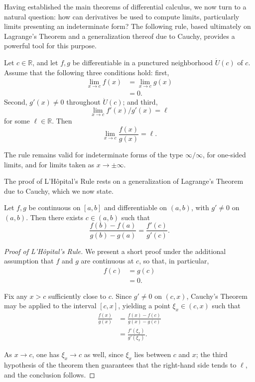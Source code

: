 Having established the main theorems of differential calculus, we now turn to a natural question: how can derivatives be used to compute limits, particularly limits presenting an indeterminate form? The following rule, based ultimately on Lagrange's Theorem and a generalization thereof due to Cauchy, provides a powerful tool for this purpose.

\begin{theorem}
Let $c \in \mathbb{R}$, and let $f, g$ be differentiable in a punctured neighborhood $\dot{U}(c)$ of $c$. Assume that the following three conditions hold: first,
\[
\begin{aligned}
\lim_{x \to c} f(x) &= \lim_{x \to c} g(x) \\
&= 0.
\end{aligned}
\]
Second, $g'(x) \neq 0$ throughout $\dot{U}(c)$; and third, \[
\lim_{x \to c} f'(x)/g'(x) = \ell
\] for some $\ell \in \mathbb{R}$. Then
\[
\lim_{x \to c} \frac{f(x)}{g(x)} = \ell.
\]

\end{theorem}

\begin{remark}
The rule remains valid for indeterminate forms of the type $\infty / \infty$, for one-sided limits, and for limits taken as $x \to \pm \infty$.
\end{remark}

The proof of L'H\^opital's Rule rests on a generalization of Lagrange's Theorem due to Cauchy, which we now state.

\begin{theorem}
Let $f, g$ be continuous on $[a,b]$ and differentiable on $(a,b)$, with $g' \neq 0$ on $(a,b)$. Then there exists $c \in (a,b)$ such that
\[
\frac{f(b) - f(a)}{g(b) - g(a)} = \frac{f'(c)}{g'(c)}.
\]

\end{theorem}

\begin{proof}[Proof of L'H\^opital's Rule]
We present a short proof under the additional assumption that $f$ and $g$ are continuous at $c$, so that, in particular,
\[
\begin{aligned}
f(c) &= g(c) \\
&= 0.
\end{aligned}
\]

Fix any $x > c$ sufficiently close to $c$. Since $g' \neq 0$ on $(c,x)$, Cauchy's Theorem may be applied to the interval $[c,x]$, yielding a point $\xi_x \in (c,x)$ such that
\[
\begin{aligned}
\frac{f(x)}{g(x)} &= \frac{f(x) - f(c)}{g(x) - g(c)} \\
&= \frac{f'(\xi_x)}{g'(\xi_x)}.
\end{aligned}
\]

As $x \to c$, one has $\xi_x \to c$ as well, since $\xi_x$ lies between $c$ and $x$; the third hypothesis of the theorem then guarantees that the right-hand side tends to $\ell$, and the conclusion follows.
\end{proof}

